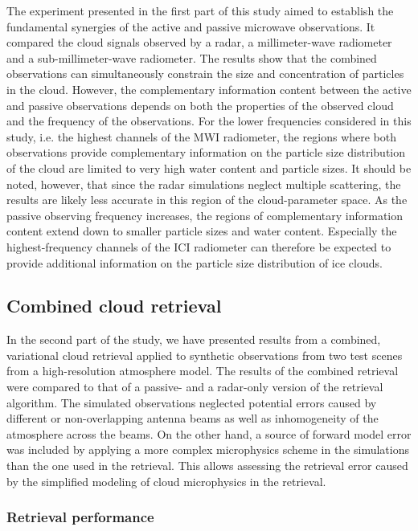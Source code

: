 \documentclass[journal abbreviation, manuscript]{copernicus}
\begin{document}
The experiment presented in the first part of this study aimed to establish the
fundamental synergies of the active and passive microwave observations. It
compared the cloud signals observed by a radar, a millimeter-wave radiometer and
a sub-millimeter-wave radiometer. The results show that the combined
observations can simultaneously constrain the size and concentration of
particles in the cloud. However, the complementary information content between
the active and passive observations depends on both the properties of the
observed cloud and the frequency of the observations. For the lower frequencies
considered in this study, i.e. the highest channels of the MWI radiometer, the
regions where both observations provide complementary information on the
particle size distribution of the cloud are limited to very high water content
and particle sizes. It should be noted, however, that since the radar
simulations neglect multiple scattering, the results are likely less accurate in
this region of the cloud-parameter space. As the passive observing frequency
increases, the regions of complementary information content extend down to
smaller particle sizes and water content. Especially the highest-frequency
channels of the ICI radiometer can therefore be expected to provide additional
information on the particle size distribution of ice clouds.

\subsection{Combined cloud retrieval}

In the second part of the study, we have presented results from a combined,
variational cloud retrieval applied to synthetic observations from two test
scenes from a high-resolution atmosphere model. The results of the combined
retrieval were compared to that of a passive- and a radar-only version of the
retrieval algorithm. The simulated observations neglected potential errors
caused by different or non-overlapping antenna beams as well as inhomogeneity of
the atmosphere across the beams. On the other hand, a source of forward model
error was included by applying a more complex microphysics scheme in the
simulations than the one used in the retrieval. This allows assessing the
retrieval error caused by the simplified modeling of cloud microphysics in the
retrieval.

\subsubsection{Retrieval performance}
\end{document}
